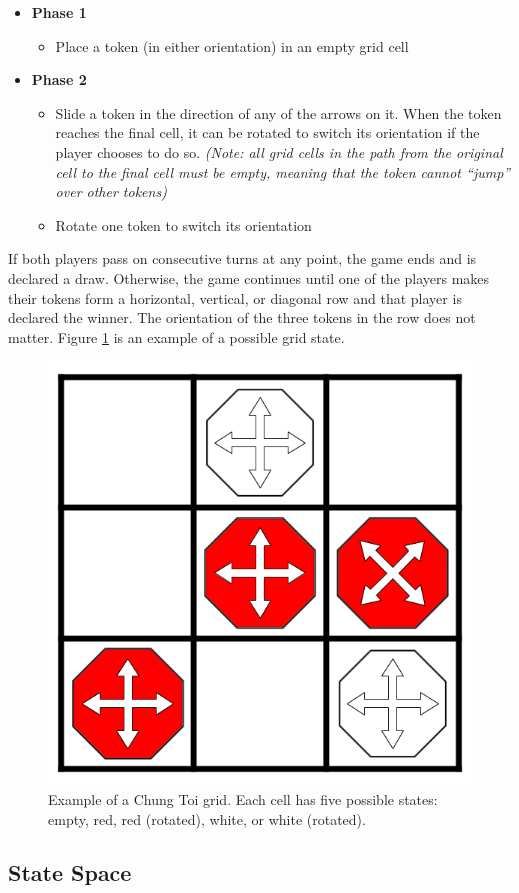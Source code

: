 \documentclass[11pt,a4paper,twoside,openright]{report}
\begin{document}
\begin{itemize}

	\item \textbf{Phase 1}
		\begin{itemize}
			\item Place a token (in either orientation) in an empty grid cell
		\end{itemize}

	\item \textbf{Phase 2}
		\begin{itemize}
			\item Slide a token in the direction of any of the arrows on it. When the token reaches the final cell, it can be rotated to switch its orientation if the player chooses to do so. \emph{(Note: all grid cells in the path from the original cell to the final cell must be empty, meaning that the token cannot ``jump'' over other tokens)}
			\item Rotate one token to switch its orientation
		\end{itemize}

\end{itemize}

If both players pass on consecutive turns at any point, the game ends and is declared a draw. Otherwise, the game continues until one of the players makes their tokens form a horizontal, vertical, or diagonal row and that player is declared the winner. The orientation of the three tokens in the row does not matter. Figure \ref{chung-toi-grid-example} is an example of a possible grid state.

\begin{figure}[htbp]
	\begin{center}
		\includegraphics[width=0.3\linewidth]{chung_toi_grid_example.png}
		\caption{Example of a Chung Toi grid. Each cell has five possible states: empty, red, red (rotated), white, or white (rotated).}
		\label{chung-toi-grid-example}
	\end{center}
\end{figure}


\subsection{State Space}
\end{document}
